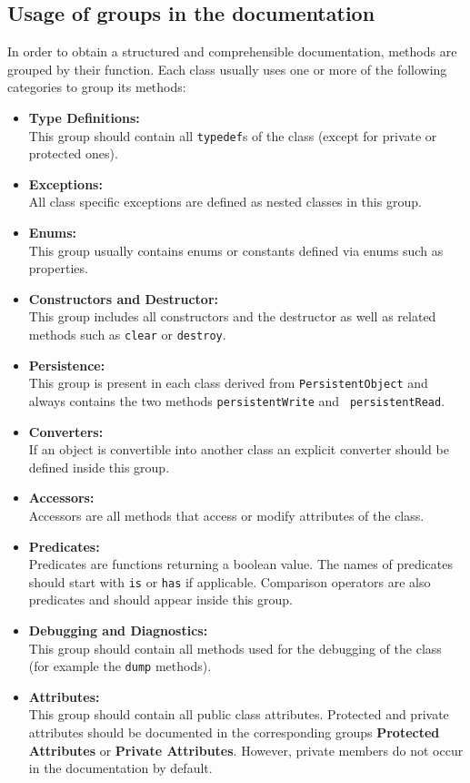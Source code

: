 \documentclass[a4paper,10pt]{article}
\begin{document}
\subsection{Usage of groups in the documentation}

In order to obtain a structured and comprehensible documentation,  methods are
grouped by their function. Each class usually uses one or more of the
following categories to group its methods:
\begin{itemize}
	\item {\bf Type Definitions:}\\
		This group should contain all {\tt typedef}s of the class 
    (except for private or protected ones).
	\item {\bf Exceptions:}\\
		All class specific exceptions are defined as nested classes in this group.
	\item {\bf Enums:}\\
		This group usually contains enums or constants defined via enums such as
		properties.
	\item {\bf Constructors and Destructor:}\\
		This group includes all constructors and the destructor as well as related
		methods such as {\tt clear} or {\tt destroy}.
	\item {\bf Persistence:}\\
		This group is present in each class derived from {\tt PersistentObject}
		and always contains the two methods {\tt persistentWrite} and {\tt
		persistentRead}.
	\item {\bf Converters:}\\
		If an object is convertible into another class an explicit
		converter should be defined inside this group.
	\item {\bf Accessors:}\\
		Accessors are all methods that access or modify attributes of the
		class.
	\item {\bf Predicates:}\\
		Predicates are functions returning a boolean value. The names of
		predicates should start with {\tt is} or {\tt has} if applicable.
		Comparison operators are also predicates and should appear inside
		this group.
	\item {\bf Debugging and Diagnostics:}\\
		This group should contain all methods used for the debugging of the class
		(for example the {\tt dump} methods).
	\item {\bf Attributes:}\\	
		This group should contain all public class attributes. Protected and
		private attributes should be documented in the corresponding groups
		{\bf Protected Attributes} or {\bf Private Attributes}. However, private 
		members do not occur in the documentation by default.
\end{itemize}
\end{document}
